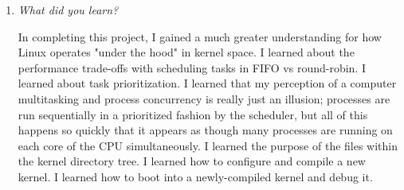 \documentclass[letterpaper,10pt,titlepage]{article}
\newcommand{\tab}{\hspace*{2em}} %
\begin{document}
\begin{enumerate}
\item \emph{What did you learn?}

\tab In completing this project, I gained a much greater understanding for how Linux operates "under the hood" in kernel space. I learned about the performance trade-offs with scheduling tasks in FIFO vs round-robin. I learned about task prioritization. I learned that my perception of a computer multitasking and process concurrency is really just an illusion; processes are run sequentially in a prioritized fashion by the scheduler, but all of this happens so quickly that it appears as though many processes are running on each core of the CPU simultaneously. I learned the purpose of the files within the kernel directory tree. I learned how to configure and compile a new kernel. I learned how to boot into a newly-compiled kernel and debug it.

\end{enumerate}

%
\end{document}
